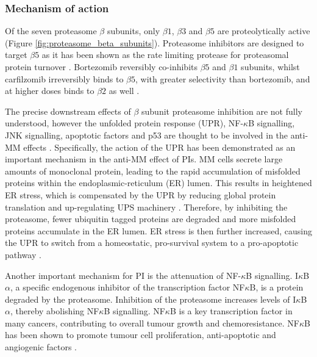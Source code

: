 \subsubsection{Mechanism of action}
Of the seven proteasome $\beta$ subunits, only $\beta1$, $\beta3$ and $\beta5$ are proteolytically active (Figure \ref{fig:proteasome_beta_subunits}). Proteasome inhibitors are designed to target $\beta5$ as it has been shown as the rate limiting protease for proteasomal protein turnover \cite{besse2019proteasome}. Bortezomib reversibly co-inhibits $\beta5$ and $\beta1$ subunits, whilst carfilzomib irreversibly binds to $\beta5$, with greater selectivity than bortezomib, and at higher doses binds to $\beta2$ as well \cite{besse2019proteasome}.

The precise downstream effects of $\beta$ subunit proteasome inhibition are not fully understood, however the unfolded protein response (UPR), NF-$\kappa$B signalling, JNK signalling, apoptotic factors and p53 are thought to be involved in the anti-MM effects \cite{kubiczkova2014proteasome}.
Specifically, the action of the UPR has been demonstrated as an important mechanism in the anti-MM effect of PIs.
MM cells secrete large amounts of monoclonal protein, leading to the rapid accumulation of  misfolded proteins within the endoplasmic-reticulum (ER) lumen.
This results in heightened ER stress, which is compensated by the UPR by reducing global protein translation and up-regulating UPS machinery \cite{wallington2018resistance}.
Therefore, by inhibiting the proteasome, fewer ubiquitin tagged proteins are degraded and more misfolded proteins accumulate in the ER lumen.
ER stress is then further increased, causing the UPR to switch from a homeostatic, pro-survival system to a pro-apoptotic pathway \cite{kubiczkova2014proteasome, wallington2018resistance}.

Another important mechanism for PI is the attenuation of NF-$\kappa$B signalling. I$\kappa$B$\alpha$, a specific endogenous inhibitor of the transcription factor NF$\kappa$B, is a protein degraded by the proteasome.
Inhibition of the proteasome increases levels of I$\kappa$B$\alpha$, thereby abolishing NF$\kappa$B signalling.
NF$\kappa$B is a key transcription factor in many cancers, contributing to overall tumour growth and chemoresistance.
NF$\kappa$B has been shown to promote tumour cell proliferation, anti-apoptotic and angiogenic factors \cite{kale2012molecular}.

